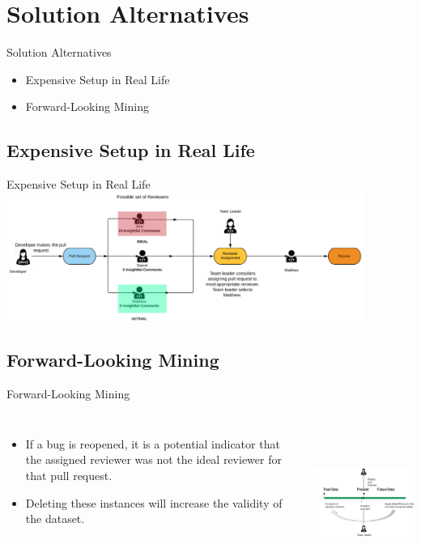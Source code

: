 \documentclass{beamer}
\begin{document}
\section{Solution Alternatives}
    \begin{frame}{Solution Alternatives}
    \begin{itemize}
        \item Expensive Setup in Real Life
        \item Forward-Looking Mining
    \end{itemize}
    \end{frame}

    \subsection{Expensive Setup in Real Life}
    \begin{frame}{Expensive Setup in Real Life}
        \includegraphics[height=4.2cm]{img/sol1.png}
    \end{frame}
    
  
    \subsection{Forward-Looking Mining}
    \begin{frame}{Forward-Looking Mining}
        \begin{columns}

        \justifying
        \begin{itemize}
            \item If a bug is reopened, it is a potential indicator that the assigned reviewer was not the ideal reviewer for that pull request.
            \item Deleting these instances will increase the validity of the dataset. 
        \end{itemize}
        
        \includegraphics[height=5.1cm]{img/sol2.png}
        \end{columns}

    \end{frame}
\end{document}
